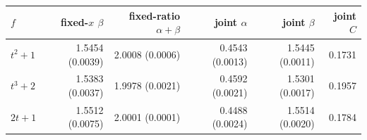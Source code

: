 \begin{tabular}{@{}lrrrrr@{}}
\toprule
$f$ & fixed-$x$ $\beta$ & fixed-ratio $\alpha+\beta$ & joint $\alpha$ & joint $\beta$ & joint $C$ \\
\midrule
$t^2+1$ & 1.5454 (0.0039) & 2.0008 (0.0006) & 0.4543 (0.0013) & 1.5445 (0.0011) & 0.1731 \\
$t^3+2$ & 1.5383 (0.0037) & 1.9978 (0.0021) & 0.4592 (0.0021) & 1.5301 (0.0017) & 0.1957 \\
$2t+1$ & 1.5512 (0.0075) & 2.0001 (0.0001) & 0.4488 (0.0024) & 1.5514 (0.0020) & 0.1784 \\
\bottomrule
\end{tabular}
